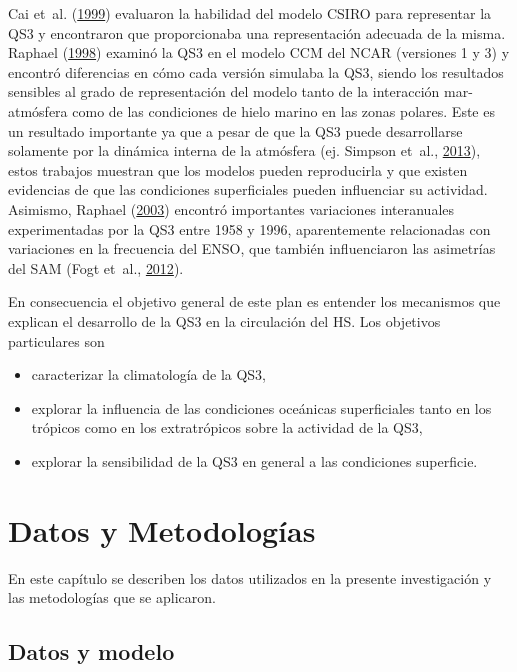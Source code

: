 \documentclass[spanish,a4paper,12pt,oneside]{book}
\providecommand{\tightlist}{%
  \setlength{\itemsep}{0pt}\setlength{\parskip}{0pt}}
\begin{document}
Cai et~al. (\protect\hyperlink{ref-Cai1999}{1999}) evaluaron la
habilidad del modelo CSIRO para representar la QS3 y encontraron que
proporcionaba una representación adecuada de la misma. Raphael
(\protect\hyperlink{ref-Raphael1998}{1998}) examinó la QS3 en el modelo
CCM del NCAR (versiones 1 y 3) y encontró diferencias en cómo cada
versión simulaba la QS3, siendo los resultados sensibles al grado de
representación del modelo tanto de la interacción mar-atmósfera como de
las condiciones de hielo marino en las zonas polares. Este es un
resultado importante ya que a pesar de que la QS3 puede desarrollarse
solamente por la dinámica interna de la atmósfera (ej. Simpson et~al.,
\protect\hyperlink{ref-Simpson2013}{2013}), estos trabajos muestran que
los modelos pueden reproducirla y que existen evidencias de que las
condiciones superficiales pueden influenciar su actividad. Asimismo,
Raphael (\protect\hyperlink{ref-Raphael2003}{2003}) encontró importantes
variaciones interanuales experimentadas por la QS3 entre 1958 y 1996,
aparentemente relacionadas con variaciones en la frecuencia del ENSO,
que también influenciaron las asimetrías del SAM (Fogt et~al.,
\protect\hyperlink{ref-Fogt2012}{2012}).

En consecuencia el objetivo general de este plan es entender los
mecanismos que explican el desarrollo de la QS3 en la circulación del
HS. Los objetivos particulares son

\begin{itemize}
\tightlist
\item
  caracterizar la climatología de la QS3,
\item
  explorar la influencia de las condiciones oceánicas superficiales
  tanto en los trópicos como en los extratrópicos sobre la actividad de
  la QS3,
\item
  explorar la sensibilidad de la QS3 en general a las condiciones
  superficie.
\end{itemize}

\chapter{Datos y Metodologías}\label{datos-y-metodologias}

En este capítulo se describen los datos utilizados en la presente
investigación y las metodologías que se aplicaron.

\section{Datos y modelo}\label{datos-y-modelo}
\end{document}
